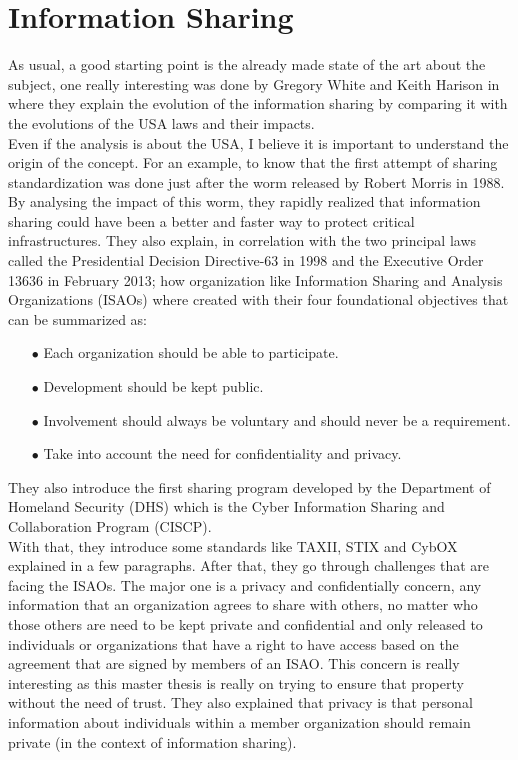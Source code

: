 \documentclass{eplmastersthesis}
\begin{document}
\section{Information Sharing}
As usual, a good starting point is the already made state of the art about the subject, one really interesting was done by Gregory White and Keith Harison in \cite{white2017state} where they explain the evolution of the information sharing by comparing it with the evolutions of the USA laws and their impacts.\\
Even if the analysis is about the USA, I believe it is important to understand the origin of the concept. For an example, to know that the first attempt of sharing standardization was done just after the worm released by Robert Morris in 1988.\\
By analysing the impact of this worm, they rapidly realized that information sharing could have been a better and faster way to protect critical infrastructures. They also explain, in correlation with the two principal laws called the Presidential Decision Directive-63 in 1998 and the Executive Order 13636 in February 2013; how organization like Information Sharing and Analysis Organizations (ISAOs) where created with their four foundational objectives that can be summarized as:
\begin{itemize}
\item[$\bullet$] Each organization should be able to participate.
\item[$\bullet$] Development should be kept public.
\item[$\bullet$] Involvement should always be voluntary and should never be a requirement.
\item[$\bullet$] Take into account the need for confidentiality and privacy.
\end{itemize}
They also introduce the first sharing program developed by the Department of Homeland Security (DHS) which is the Cyber Information Sharing and Collaboration Program (CISCP).\\
With that, they introduce some standards like TAXII, STIX and CybOX explained in a few paragraphs. After that, they go through challenges that are facing the ISAOs. The major one is a privacy and confidentially concern, any information that an organization agrees to share with others, no matter who those others are need to be kept private and confidential and only released to individuals or organizations that have a right to have access based on the agreement that are signed by members of an ISAO. This concern is really interesting as this master thesis is really on trying to ensure that property without the need of trust. They also explained that privacy is that personal information about individuals within a member organization should remain private (in the context of information sharing).
\end{document}
